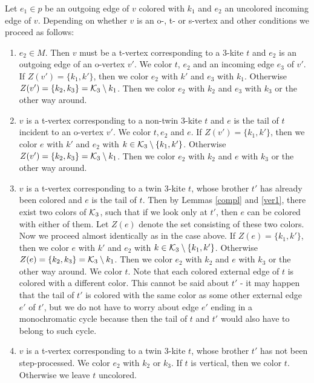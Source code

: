 \documentclass[a4, 11pt]{article}
\newcommand{\<}{\langle}
\renewcommand{\>}{\rangle}
\newcommand{\Kt}{{\cal K}_3}
\begin{document}
Let $e_1 \in p$ be an outgoing edge of $v$ colored with $k_1$ and $e_2$ an uncolored incoming edge of $v$. Depending on whether $v$ is an o-, t- or s-vertex and other conditions we proceed
as follows:
\begin{enumerate}
\item $e_2 \in M$. Then $v$ must be a t-vertex corresponding to a $3$-kite $t$ and $e_2$ is an outgoing edge of an o-vertex $v'$. We color $t$, $e_2$ and an incoming edge $e_3$ of $v'$. If $Z(v')=\{k_1, k'\}$, then we  color $e_2$ with $k'$ and $e_3$ with $k_1$. Otherwise $Z(v')=\{k_2, k_3\} = \Kt \setminus k_1$. Then we color $e_2$ with $k_2$ and $e_3$ with $k_3$ or the other way around.

\item $v$ is a t-vertex corresponding to a non-twin $3$-kite $t$ and $e$ is the tail of $t$ incident to an o-vertex $v'$. We color $t, e_2$ and $e$.  If $Z(v')=\{k_1, k'\}$, then we  color $e$ with $k'$ and $e_2$ with $k \in \Kt \setminus \{k_1, k'\}$. Otherwise $Z(v')=\{k_2, k_3\} = \Kt \setminus k_1$. Then we color $e_2$ with $k_2$ and $e$ with $k_3$ or the other way around.

\item $v$ is a t-vertex corresponding to a twin $3$-kite $t$, whose brother $t'$ has already been colored and $e$ is the tail of  $t$. Then by Lemmas \ref{compl} and \ref{ver1}, there exist two colors of $\Kt$, such that if we look only at $t'$, then $e$ can be colored with either of them. Let $Z(e)$ denote the set consisting of these two colors.  Now we proceed almost identically as in the case above. If $Z(e)=\{k_1, k'\}$, then we  color $e$ with $k'$ and $e_2$ with $k \in \Kt \setminus \{k_1, k'\}$. Otherwise $Z(e)=\{k_2, k_3\} = \Kt \setminus k_1$. Then we color $e_2$ with $k_2$ and $e$ with $k_3$ or the other way around. We color $t$. Note  that  each colored external edge of $t$ is colored with a different color. This cannot be said about $t'$ - it may happen that the tail of $t'$ is colored with the same color as some other external edge $e'$ of $t'$, but we do not have to worry about edge $e'$ ending in a monochromatic cycle because then the tail of $t$ and $t'$ would also have to belong to such cycle. 




\item $v$ is a t-vertex corresponding to a twin $3$-kite $t$, whose brother $t'$ has not been step-processed.  We color $e_2$ with $k_2$ or $k_3$.
If $t$ is vertical, then we color $t$. Otherwise we leave $t$ uncolored.


\end{enumerate}
\end{document}
